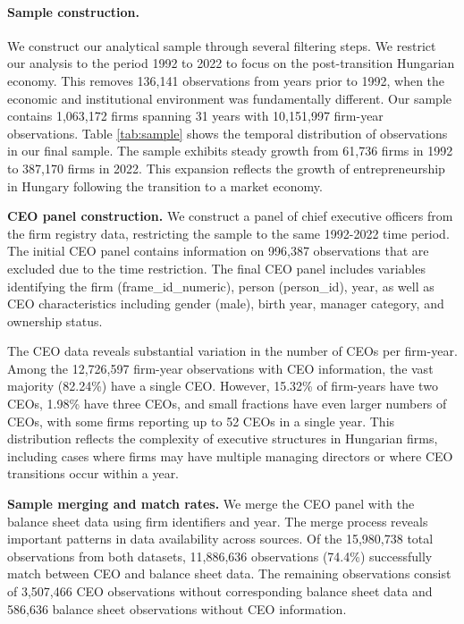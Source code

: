 \documentclass[11pt,a4paper]{article}
\begin{document}
\paragraph{Sample construction.} We construct our analytical sample through several filtering steps. We restrict our analysis to the period 1992 to 2022 to focus on the post-transition Hungarian economy. This removes 136,141 observations from years prior to 1992, when the economic and institutional environment was fundamentally different. Our sample contains 1,063,172 firms spanning 31 years with 10,151,997 firm-year observations. Table \ref{tab:sample} shows the temporal distribution of observations in our final sample. The sample exhibits steady growth from 61,736 firms in 1992 to 387,170 firms in 2022. This expansion reflects the growth of entrepreneurship in Hungary following the transition to a market economy.



\textbf{CEO panel construction.} We construct a panel of chief executive officers from the firm registry data, restricting the sample to the same 1992-2022 time period. The initial CEO panel contains information on 996,387 observations that are excluded due to the time restriction. The final CEO panel includes variables identifying the firm (frame\_id\_numeric), person (person\_id), year, as well as CEO characteristics including gender (male), birth year, manager category, and ownership status.

The CEO data reveals substantial variation in the number of CEOs per firm-year. Among the 12,726,597 firm-year observations with CEO information, the vast majority (82.24\%) have a single CEO. However, 15.32\% of firm-years have two CEOs, 1.98\% have three CEOs, and small fractions have even larger numbers of CEOs, with some firms reporting up to 52 CEOs in a single year. This distribution reflects the complexity of executive structures in Hungarian firms, including cases where firms may have multiple managing directors or where CEO transitions occur within a year.

\textbf{Sample merging and match rates.} We merge the CEO panel with the balance sheet data using firm identifiers and year. The merge process reveals important patterns in data availability across sources. Of the 15,980,738 total observations from both datasets, 11,886,636 observations (74.4\%) successfully match between CEO and balance sheet data. The remaining observations consist of 3,507,466 CEO observations without corresponding balance sheet data and 586,636 balance sheet observations without CEO information.
\end{document}
